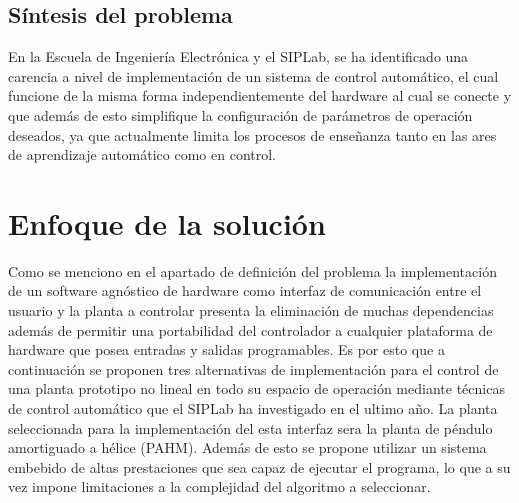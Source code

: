 \documentclass[12pt]{article}
\begin{document}
\subsection{Síntesis del problema}

En la Escuela de Ingeniería Electrónica y el SIPLab, se ha identificado una carencia a nivel de implementación de un sistema de control automático, el cual funcione de la misma forma independientemente del  hardware al cual se conecte y que además de esto simplifique la configuración de parámetros de operación deseados, ya que actualmente limita los procesos de enseñanza tanto en las ares de aprendizaje automático como en control.




\section{Enfoque de la solución}

Como se menciono en el apartado de definición del problema la implementación de un software agnóstico de hardware como interfaz de comunicación entre el usuario y la planta a controlar presenta la eliminación de muchas dependencias además de permitir una portabilidad del controlador a cualquier plataforma de hardware que posea entradas y salidas programables. Es por esto que a continuación se proponen tres alternativas de implementación para el control de una planta prototipo no lineal en todo su espacio de operación mediante técnicas de control automático que el SIPLab ha investigado en el ultimo año. La planta seleccionada para la implementación del esta interfaz sera la planta de péndulo amortiguado a hélice (PAHM). Además de esto se propone utilizar un sistema embebido de altas prestaciones que sea capaz de ejecutar el programa, lo que a su vez impone limitaciones a la complejidad del algoritmo a seleccionar.
\end{document}
